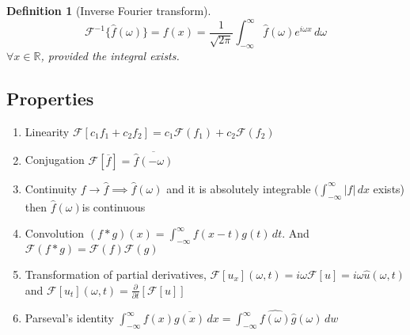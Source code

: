 \documentclass[oneside,11pt,pdftex,final]{book}%
\numberwithin{equation}{section}
\newtheorem{example}[theorem]{Example}
\newtheorem{definition}[theorem]{Definition}
\numberwithin{section}{chapter}
\numberwithin{equation}{chapter}
\newcommand{\R}{\mathbb{R}}
\begin{document}
\begin{definition}[Inverse Fourier transform]
	\[ \mathcal{F}^{-1}\{\hat{f}(\omega)\}=f(x)=\frac{1}{\sqrt{2\pi}}\int_{-\infty}^\infty \hat{f}(\omega) e^{i \omega x}\, d \omega \]
	$ \forall x \in \R $, provided the integral exists.
\end{definition}


\subsection{Properties}
\begin{enumerate}
	\item Linearity $ \mathcal{F}[c_1f_1+c_2f_2]=c_1\mathcal{F}(f_1)+c_2\mathcal{F}(f_2) $
	\item Conjugation $ \mathcal{F}[\overline{f}]=\overline{\hat{f}(-\omega)} $
	\item Continuity $ f\to \hat{f}\implies \hat{f}(\omega ) $ and it is absolutely integrable $ (\int_{-\infty}^\infty |f|\, dx$ exists) then $ \hat{f}(\omega) $is continuous
	\item Convolution $ (f*g)(x)=\int_{-\infty}^\infty f(x-t)g(t)\, dt $. And $ \mathcal{F}(f*g)=\mathcal{F}(f)\mathcal{F}(g) $
	\item Transformation of partial derivatives, $ \mathcal{F}[u_x](\omega,t)=i\omega \mathcal{F}[u]=i \omega \hat{u}(\omega,t ) $ and $ \mathcal{F}[u_t](\omega,t)=\frac{\partial }{\partial t}[\mathcal{F}[u]] $
	\item Parseval's identity $ \int_{-\infty}^\infty f(x)\overline{g(x)}\, dx= \int_{-\infty}^\infty \hat{f(\omega)}\hat{g}(\omega)\, dw $
\end{enumerate}
\end{document}
